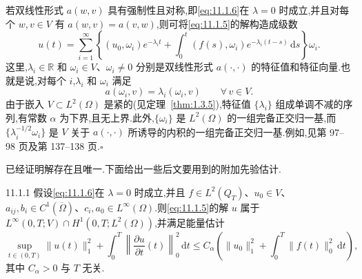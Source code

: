 \begin{note}
若双线性形式 \(a(w,v)\) 具有强制性且对称,即\eqref{eq:11.1.6}在 \(\lambda=0\) 时成立,并且对每个 \(w,v\in V\) 有 \(a(w,v)=a(v,w)\),则可将\eqref{eq:11.1.5}的解构造成级数
\begin{equation}\label{eq:11.1.14}
  u(t)=\sum_{i=1}^\infty\left\{(u_0,\omega_i)e^{-\lambda_i t}
           +\int_0^t(f(s),\omega_i)e^{-\lambda_i(t-s)}\,\mathrm ds\right\}\omega_i.
\end{equation}
这里,\(\lambda_i\in\mathbb R\) 和 \(\omega_i\in V\)、\(\omega_i\ne0\) 分别是双线性形式 \(a(\cdot,\cdot)\) 的特征值和特征向量.也就是说,对每个 \(i\),\(\lambda_i\) 和 \(\omega_i\) 满足
\[
  a(\omega_i,v)=\lambda_i(\omega_i,v)\qquad\forall\,v\in V.
\]
由于嵌入 \(V\subset L^2(\Omega)\) 是紧的(见定理~\ref{thm:1.3.5}),特征值 \(\{\lambda_i\}\) 组成单调不减的序列,有常数 \(\alpha\) 为下界,且无上界.此外,\(\{\omega_i\}\) 是 \(L^2(\Omega)\) 的一组完备正交归一基,而 \(\{\lambda_i^{-1/2}\omega_i\}\) 是 \(V\) 关于 \(a(\cdot,\cdot)\) 所诱导的内积的一组完备正交归一基.例如,见第 97–98 页及第 137–138 页.\hfill\(\square\)
\end{note}

已经证明解存在且唯一.下面给出一些后文要用到的附加先验估计.

\begin{proposition}[]{11.1.1}
假设\eqref{eq:11.1.6}在 \(\lambda=0\) 时成立,并且 \(f\in L^2(Q_T)\)、\(u_0\in V\)、\(a_{ij},b_i\in C^1(\overline\Omega)\)、\(c_i,a_0\in L^\infty(\Omega)\).则\eqref{eq:11.1.5}的解 \(u\) 属于 \(L^\infty(0,T;V)\cap H^1(0,T;L^2(\Omega))\),并满足能量估计
\begin{equation}\label{eq:11.1.15}
  \sup_{t\in(0,T)}\|u(t)\|_1^2+\int_0^T
       \left\|\frac{\partial u}{\partial t}(t)\right\|_0^2\,\mathrm dt
     \le C_\alpha\left(\|u_0\|_1^2+\int_0^T\|f(t)\|_0^2\,\mathrm dt\right),
\end{equation}
其中 \(C_\alpha>0\) 与 \(T\) 无关.
\end{proposition}

